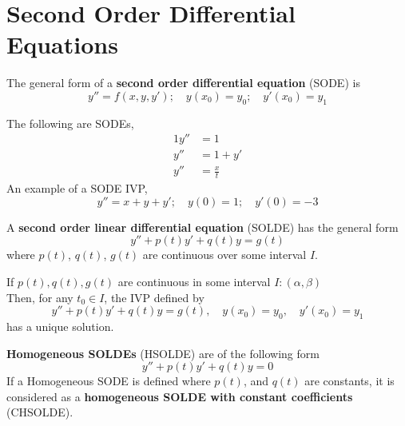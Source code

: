 \documentclass[diffeq.tex]{subfiles}
\begin{document}
\section{Second Order Differential Equations}
\begin{definition}
    The general form of a \textbf{second order differential equation} (SODE) is
    \begin{equation}
        y'' = f(x, y, y');\quad y(x_{0}) = y_{0};\quad y'(x_{0}) = y_{1}
    \end{equation}
\end{definition}
\np
\begin{example}
    The following are SODEs,
    \begin{alignat}{1}
        y'' &= 1\\
        y'' &= 1 + y'\\
        y'' &= \frac{x}{t}
    \end{alignat}
    An example of a SODE IVP,
    \begin{equation}
        y'' = x + y + y';\quad y(0) = 1;\quad y'(0) = -3
    \end{equation}
\end{example}
\begin{definition}
    A \textbf{second order linear differential equation} (SOLDE) has the general form
    \begin{equation}
        y'' + p(t)y' + q(t)y = g(t)
    \end{equation}
    where $p(t)$, $q(t)$, $g(t)$ are continuous over some interval $I$.
\end{definition}
\begin{theorem}
    If $p(t), q(t), g(t)$ are continuous in some interval $I: (\alpha, \beta)$\\
    Then, for any $t_{0} \in I$, the IVP defined by
    \begin{equation}
        y'' + p(t)y' + q(t)y = g(t),\quad y(x_{0}) = y_{0},\quad y'(x_{0}) = y_{1}
    \end{equation}
    has a unique solution.
\end{theorem}
\begin{definition}
    \textbf{Homogeneous SOLDEs} (HSOLDE) are of the following form
    \begin{equation}
        y'' + p(t)y' + q(t)y = 0
    \end{equation}
    If a Homogeneous SODE is defined where $p(t)$, and $q(t)$ are constants, it is considered as a \textbf{homogeneous SOLDE with constant coefficients} (CHSOLDE).
\end{definition}
\np
\end{document}
